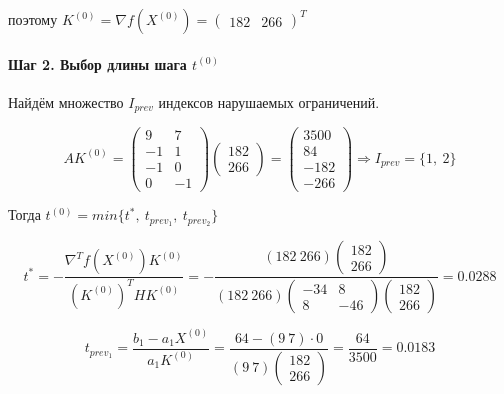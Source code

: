 поэтому $K^{(0)} = \nabla f(X^{(0)}) = \begin{pmatrix}
	182 & 266
	\end{pmatrix}^T$

\paragraph{Шаг 2. Выбор длины шага $t^{(0)}$}

Найдём множество $I_{prev}$ индексов нарушаемых ограничений.

\begin{equation*}
	A K^{(0)} = \begin{pmatrix}
		9 & 7
		\\
		-1 & 1
		\\
		-1 & 0
		\\
		0 & -1
	\end{pmatrix}
	\begin{pmatrix}
		182 \\ 266
	\end{pmatrix}
	=
	\begin{pmatrix}
		3500 \\ 84 \\ -182 \\ -266
	\end{pmatrix}
	\Rightarrow I_{prev} = \{1,\ 2\}
\end{equation*}

Тогда $t^{(0)} = min\{t^*,\ t_{prev_1},\ t_{prev_2}\}$

\begin{equation*}
	t^* = -\frac{\nabla^T f(X^{(0)}) K^{(0)}}{(K^{(0)})^T H K^{(0)}} = -\frac{(182\ 266) \begin{pmatrix} 182 \\ 266 \end{pmatrix}}{(182\ 266) \begin{pmatrix} -34 & 8 \\ 8 & -46 \end{pmatrix} \begin{pmatrix} 182 \\ 266 \end{pmatrix}} = 0.0288
\end{equation*}

\begin{equation*}
	t_{prev_1} = \frac{b_1 - a_1 X^{(0)}}{a_1 K^{(0)}} = \frac{64 - (9\ 7) \cdot 0}{(9\ 7) \begin{pmatrix} 182 \\ 266 \end{pmatrix}} = \frac{64}{3500} = 0.0183
\end{equation*}

